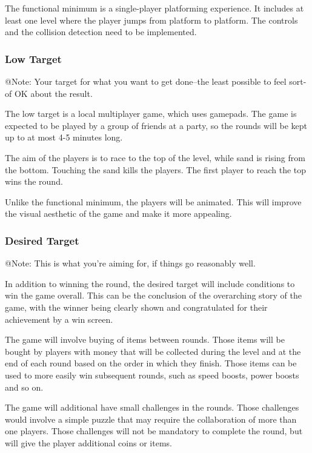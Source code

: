 The functional minimum is a single-player platforming experience. It includes at least one level where the player jumps from platform to platform. The controls and the collision detection need to be implemented.

\subsubsection{Low Target}

\begin{TempText}
	@Note: Your target for what you want to get done--the least possible to feel sort-of OK about the result.
\end{TempText}

The low target is a local multiplayer game, which uses gamepads. The game is expected to be played by a group of friends at a party, so the rounds will be kept up to at most 4-5 minutes long.
    
The aim of the players is to race to the top of the level, while sand is rising from the bottom. Touching the sand kills the players. The first player to reach the top wins the round.
    
Unlike the functional minimum, the players will be animated. This will improve the visual aesthetic of the game and make it more appealing.

\subsubsection{Desired Target}

\begin{TempText}
	@Note: This is what you're aiming for, if things go reasonably well.
\end{TempText}

In addition to winning the round, the desired target will include conditions to win the game overall. This can be the conclusion of the overarching story of the game, with the winner being clearly shown and congratulated for their achievement by a win screen.

The game will involve buying of items between rounds. Those items will be bought by players with money that will be collected during the level and at the end of each round based on the order in which they finish. Those items can be used to more easily win subsequent rounds, such as speed boosts, power boosts and so on.

The game will additional have small challenges in the rounds. Those challenges would involve a simple puzzle that may require the collaboration of more than one players. Those challenges will not be mandatory to complete the round, but will give the player additional coins or items.

